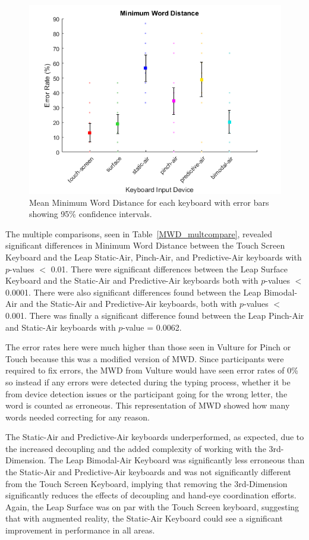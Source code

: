\begin{figure}[h]
	\centering
	\includegraphics{fig_MWD_mean}
	\caption[Mean Minimum Word Distance]{Mean Minimum Word Distance for each keyboard with error bars showing 95\% confidence intervals.}
	\label{fig_MWD_mean}
\end{figure}

The multiple comparisons, seen in Table~\ref{MWD_multcompare}, revealed significant differences in Minimum Word Distance between the Touch Screen Keyboard and the Leap Static-Air, Pinch-Air, and Predictive-Air keyboards with $p$-values $<$ 0.01. There were significant differences between the Leap Surface Keyboard and the Static-Air and Predictive-Air keyboards both with $p$-values $<$ 0.0001. There were also significant differences found between the Leap Bimodal-Air and the Static-Air and Predictive-Air keyboards, both with $p$-values $<$ 0.001. There was finally a significant difference found between the Leap Pinch-Air and Static-Air keyboards with $p$-value = 0.0062.

The error rates here were much higher than those seen in Vulture for Pinch or Touch \cite{ref_vulture} because this was a modified version of MWD. Since participants were required to fix errors, the MWD from Vulture would have seen error rates of 0\% so instead if any errors were detected during the typing process, whether it be from device detection issues or the participant going for the wrong letter, the word is counted as erroneous. This representation of MWD showed how many words needed correcting for any reason.

The Static-Air and Predictive-Air keyboards underperformed, as expected, due to the increased decoupling and the added complexity of working with the 3rd-Dimension. The Leap Bimodal-Air Keyboard was significantly less erroneous than the Static-Air and Predictive-Air keyboards and was not significantly different from the Touch Screen Keyboard, implying that removing the 3rd-Dimension significantly reduces the effects of decoupling and hand-eye coordination efforts. Again, the Leap Surface was on par with the Touch Screen keyboard, suggesting that with augmented reality, the Static-Air Keyboard could see a significant improvement in performance in all areas.

